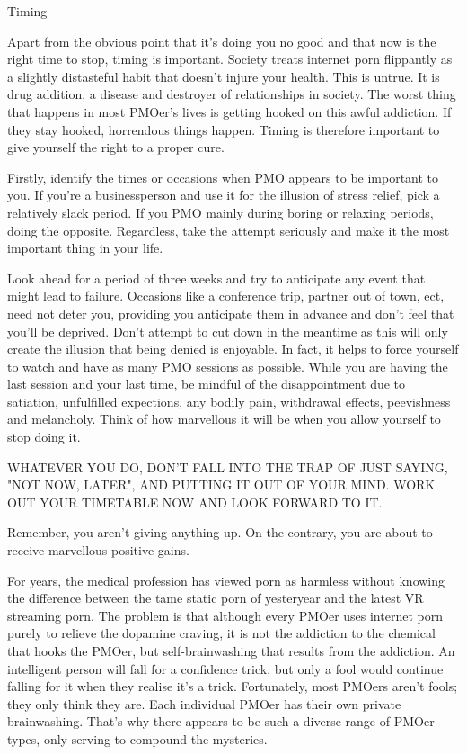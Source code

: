 Timing

Apart from the obvious point that it's doing you no good and that now is the right time to stop, timing is important. Society treats internet porn flippantly as a slightly distasteful habit that doesn't injure your health. This is untrue. It is drug addition, a disease and destroyer of relationships in society. The worst thing that happens in most PMOer's lives is getting hooked on this awful addiction. If they stay hooked, horrendous things happen. Timing is therefore important to give yourself the right to a proper cure.

Firstly, identify the times or occasions when PMO appears to be important to you. If you're a businessperson and use it for the illusion of stress relief, pick a relatively slack period. If you PMO mainly during boring or relaxing periods, doing the opposite. Regardless, take the attempt seriously and make it the most important thing in your life.

Look ahead for a period of three weeks and try to anticipate any event that might lead to failure. Occasions like a conference trip, partner out of town, ect, need not deter you, providing you anticipate them in advance and don't feel that you'll be deprived. Don't attempt to cut down in the meantime as this will only create the illusion that being denied is enjoyable. In fact, it helps to force yourself to watch and have as many PMO sessions as possible. While you are having the last session and your last time, be mindful of the disappointment due to satiation, unfulfilled expections, any bodily pain, withdrawal effects, peevishness and melancholy. Think of how marvellous it will be when you allow yourself to stop doing it.

\huge{WHATEVER YOU DO, DON'T FALL INTO THE TRAP OF JUST SAYING, "NOT NOW, LATER", AND PUTTING IT OUT OF YOUR MIND. WORK OUT YOUR TIMETABLE NOW AND LOOK FORWARD TO IT.}

Remember, you aren't giving anything up. On the contrary, you are about to receive marvellous positive gains.

For years, the medical profession has viewed porn as harmless without knowing the difference between the tame static porn of yesteryear and the latest VR streaming porn. The problem is that although every PMOer uses internet porn purely to relieve the dopamine craving, it is not the addiction to the chemical that hooks the PMOer, but self-brainwashing that results from the addiction. An intelligent person will fall for a confidence trick, but only a fool would continue falling for it when they realise it's a trick. Fortunately, most PMOers aren't fools; they only think they are. Each individual PMOer has their own private brainwashing. That's why there appears to be such a diverse range of PMOer types, only serving to compound the mysteries.

